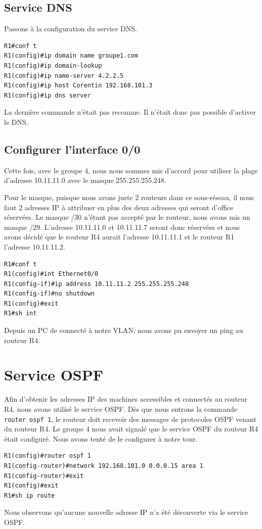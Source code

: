 \documentclass[a4paper,10pt]{article}
\begin{document}
\subsection{Service DNS}
Passons à la configuration du service DNS.
\begin{verbatim}
R1#conf t
R1(config)#ip domain name groupe1.com
R1(config)#ip domain-lookup
R1(config)#ip name-server 4.2.2.5
R1(config)#ip host Corentin 192.168.101.3
R1(config)#ip dns server
\end{verbatim}
La dernière commande n'était pas reconnue. Il n'était donc pas possible d'activer le DNS.

\subsection{Configurer l'interface 0/0}
Cette fois, avec le groupe 4, nous nous sommes mis d'accord pour utiliser la plage d'adresse 10.11.11.0 avec le masque 255.255.255.248.

Pour le masque, puisque nous avons juste 2 routeurs dans ce sous-réseau, il nous faut 2 adresses IP à attribuer en plus des deux adresses qui seront d'office réservées. Le masque /30 n'étant pas accepté par le routeur, nous avons mis un masque /29.
L'adresse 10.11.11.0 et 10.11.11.7 seront donc réservées et nous avons décidé que le routeur R4 aurait l'adresse 10.11.11.1 et le routeur R1 l'adresse 10.11.11.2.
\begin{verbatim}
R1#conf t
R1(config)#int Ethernet0/0
R1(config-if)#ip address 10.11.11.2 255.255.255.248
R1(config-if)#no shutdown
R1(config)#exit
R1#sh int
\end{verbatim}
Depuis un PC de connecté à notre VLAN, nous avons pu envoyer un ping au routeur R4.

\section{Service OSPF}
Afin d'obtenir les adresses IP des machines accessibles et connectés au routeur R4, nous avons utilisé le service OSPF.
Dès que nous entrons la commande \texttt{router ospf 1}, le routeur doit recevoir des messages de protocoles OSPF venant du routeur R4.
Le groupe 4 nous avait signalé que le service OSPF du routeur R4 était configuré. Nous avons tenté de le configurer à notre tour.
\begin{verbatim}
R1(config)#router ospf 1
R1(config-router)#network 192.168.101.0 0.0.0.15 area 1
R1(config-router)#exit
R1(config)#exit
R1#sh ip route
\end{verbatim}
Nous observons qu'aucune nouvelle adresse IP n'a été découverte via le service OSPF.
\end{document}
